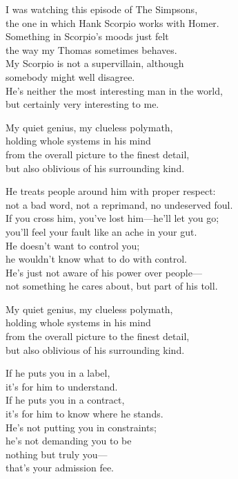 \begin{lyrics}
I was watching this episode of The Simpsons,\\
the one in which Hank Scorpio works with Homer.\\
Something in Scorpio’s moods just felt\\
the way my Thomas sometimes behaves.\\
My Scorpio is not a supervillain, although\\
somebody might well disagree.\\
He’s neither the most interesting man in the world,\\
but certainly very interesting to me.

My quiet genius, my clueless polymath,\\
holding whole systems in his mind\\
from the overall picture to the finest detail,\\
but also oblivious of his surrounding kind.

He treats people around him with proper respect:\\
not a bad word, not a reprimand, no undeserved foul.\\
If you cross him, you’ve lost him—he’ll let you go;\\
you’ll feel your fault like an ache in your gut.\\
He doesn’t want to control you;\\
he wouldn’t know what to do with control.\\
He’s just not aware of his power over people—\\
not something he cares about, but part of his toll.

My quiet genius, my clueless polymath,\\
holding whole systems in his mind\\
from the overall picture to the finest detail,\\
but also oblivious of his surrounding kind.

If he puts you in a label,\\
it’s for him to understand.\\
If he puts you in a contract,\\
it’s for him to know where he stands.\\
He’s not putting you in constraints;\\
he’s not demanding you to be\\
nothing but truly you—\\
that’s your admission fee.


\end{lyrics}
